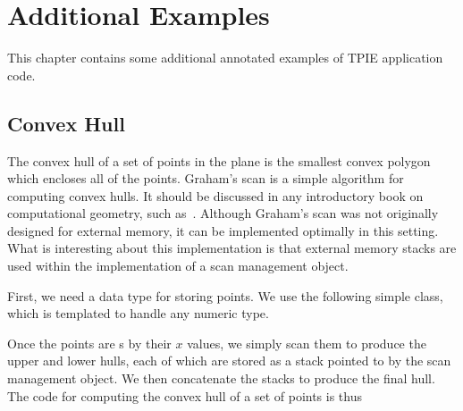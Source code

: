 
\chapter{Additional Examples} \label{ch:examples}

This chapter contains some additional annotated examples of 
TPIE application code.

\section{Convex Hull}
\label{sec:convex-hull}

The convex hull of a set of points in the plane is the smallest convex
polygon which encloses all of the points.  Graham's scan is a simple
algorithm for computing convex hulls.  It should be discussed in any
introductory book on computational geometry, such
as~\cite{preparata:computational}.  Although Graham's scan was not
originally designed for external memory, it can be implemented optimally in
this setting.  What is interesting about this implementation is that
external memory stacks are used within the implementation of a scan
management object.

First, we need a data type for storing points.  We use the following
simple class, which is templated to handle any numeric type.



Once the points are s by their $x$ values, we simply scan them to
produce the upper and lower hulls, each of which are stored as a stack
pointed to by the scan management object.  We then concatenate the
stacks to produce the final hull.  The code for computing the convex
hull of a set of points is thus

